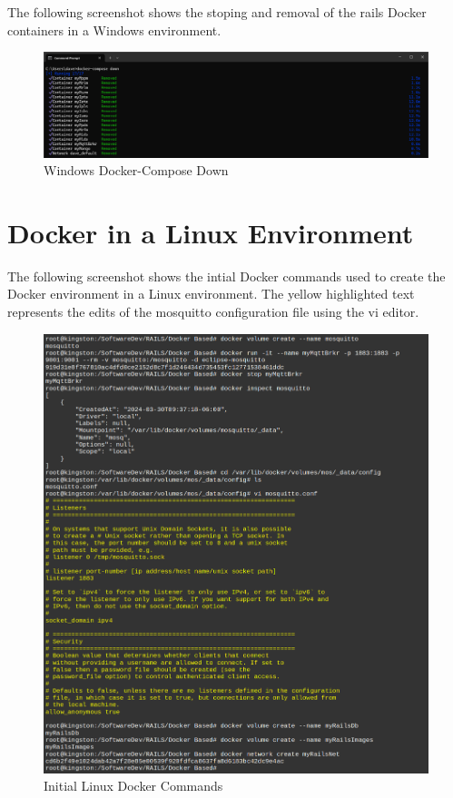 The following screenshot shows the stoping and removal of the \gls{rails} Docker containers in a Windows environment.
\begin{figure}[H]
    \centering
    \includegraphics[scale=0.4]{win4.png}
    \caption{Windows Docker-Compose Down}
    \label{fig:docker-cmds-3}
\end{figure}
\newpage
\section{Docker in a Linux Environment}
\label{sec:linux-cmds}
The following screenshot shows the intial Docker commands used to create the Docker environment in a Linux environment. The yellow highlighted text represents the edits of the mosquitto configuration file using the vi editor.
\begin{figure}[H]
    \centering
    \includegraphics[scale=0.44]{win1l.png}
    \caption{Initial Linux Docker Commands}
    \label{fig:linux-docker-cmds}
\end{figure}

